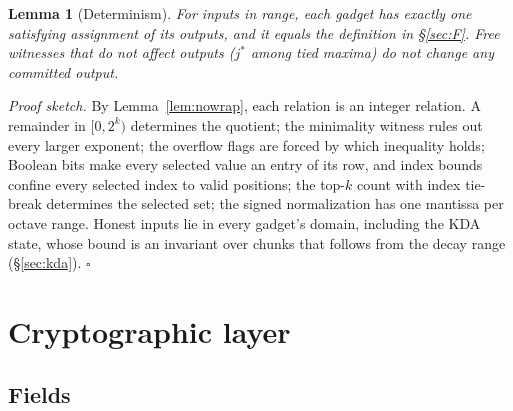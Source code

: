 \documentclass[11pt]{article}
\newtheorem{lemma}{Lemma}
\begin{document}
\begin{lemma}[Determinism]
\label{lem:det}
For inputs in range, each gadget has exactly one satisfying assignment of its outputs, and it equals the definition in \S\ref{sec:F}.
Free witnesses that do not affect outputs (\(j^\ast\) among tied maxima) do not change any committed output.
\end{lemma}
\noindent\emph{Proof sketch.}
By Lemma~\ref{lem:nowrap}, each relation is an integer relation.
A remainder in \([0, 2^k)\) determines the quotient; the minimality witness rules out every larger exponent; the overflow flags are forced by which inequality holds; Boolean bits make every selected value an entry of its row, and index bounds confine every selected index to valid positions; the top-\(k\) count with index tie-break determines the selected set; the signed normalization has one mantissa per octave range. Honest inputs lie in every gadget's domain, including the KDA state, whose bound is an invariant over chunks that follows from the decay range (\S\ref{sec:kda}). \(\square\)

\section{Cryptographic layer}
\label{sec:crypto}

\subsection{Fields}
\label{sec:fields}
\end{document}

